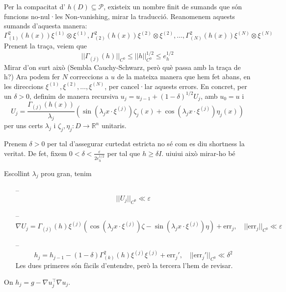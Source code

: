\documentclass[11pt,a4paper,openright,oneside]{book}
\numberwithin{equation}{section}
\theoremstyle{definition}
\begin{document}
Per la compacitat d' $h(D)\subseteq\mathcal P$, existeix un nombre finit de sumands que són funcions no-nul·les{\color{blue} Non-vanishing, mirar la traducció}. Reanomenem aquests sumands d'aquesta manera:
\begin{equation*}
    \Gamma^2_{(1)}(h(x))\xi^{(1)}\otimes\xi^{(1)}, \Gamma^2_{(2)}(h(x))\xi^{(2)}\otimes\xi^{(2)}, \dots, \Gamma^2_{(N)}(h(x))\xi^{(N)}\otimes\xi^{(N)}
\end{equation*}
Prenent la traça, veiem que 
\begin{equation*}
    ||\Gamma_{(j)}(h)||_{C^0} \le ||h||_{C^0}^{1/2} \le e_h^{1/2}
\end{equation*}
{\color{blue} Mirar d'on surt això (Sembla Cauchy-Schwarz, però què passa amb la traça de h?)}
Ara podem fer $N$ correccions a $u$ de la mateixa manera que hem fet abans, en les direccions $\xi^{(1)}, \xi^{(2)}, \dots, \xi^{(N)}$, per cancel·lar aquests errors. En concret, per un $\delta>0$, definim de manera recursiva $u_j = u_{j-1}+(1-\delta)^{1/2}U_j$, amb $u_0 = u$ i 
\begin{equation*}
    U_j = \frac{\Gamma_{(j)}(h(x))}{\lambda_j}\left( \sin(\lambda_j x\cdot\xi^{(j)})\zeta_j(x) + \cos(\lambda_j x\cdot\xi^{(j)})\eta_j(x) \right)
\end{equation*}
per uns certs $\lambda_j$ i $\zeta_j, \eta_j:D\to\mathbb R^n$ unitaris.

Prenem $\delta > 0$ per tal d'assegurar curtedat estricta {\color{blue} no sé com es diu shortness la veritat}. De fet, fixem $0<\delta<\frac{\varepsilon}{2e_h^{1/2}}$ per tal que $h\ge\delta I$. {\color{blue} uiuiui això mirar-ho bé}

Escollint $\lambda_j$ prou gran, tenim
\begin{itemize}
    \item[--]
    \begin{equation}
        ||U_j||_{C^0} \ll \varepsilon
    \end{equation}
    \item[--]
    \begin{equation}
        \nabla U_j = \Gamma_{(j)}(h)\xi^{(j)}(\cos(\lambda_j x\cdot\xi^{(j)})\zeta - \sin(\lambda_j x\cdot\xi^{(j)})\eta) + \text{err}_j,\quad ||\text{err}_j||_{C^0} \ll \varepsilon
    \end{equation}
    \item[--]
    \begin{equation}
        h_j=h_{j-1}-(1-\delta)\Gamma^2_{(k)}(h)\xi^{(j)}\xi^{(j)} + \text{err}_j', \quad ||\text{err}_j'||_{C^0} \ll \delta^2
    \end{equation}
    {\color{blue} Les dues primeres són fàcils d'entendre, però la tercera l'hem de revisar.}
\end{itemize}
On $h_j=g-\nabla u_j ^{\intercal}\nabla u_j$. 
\end{document}
